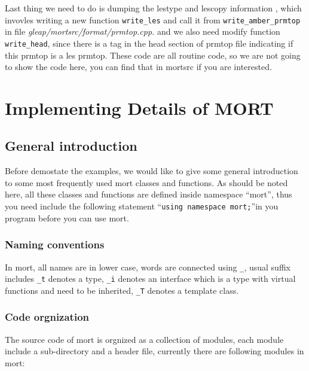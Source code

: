 \documentclass[letterpaper]{book}
\begin{document}
Last thing we need to do is dumping the lestype and lescopy information , which invovles writing
a new function \lstinline$write_les$ and call it from \lstinline$write_amber_prmtop$ in file 
{\it gleap/mortsrc/format/prmtop.cpp.} and we also need modify function \lstinline$write_head$, since 
there is a tag in the head section of prmtop file indicating if this prmtop is a les prmtop. These 
code are all routine code, so we are not going to show the code here, you can find 
that in mortsrc if you are interested. 



\chapter{Implementing Details of MORT}


\section{General introduction}
  Before demostate the examples, we would like to give some general introduction to some
most frequently used mort classes and functions. As should be noted here, all these classes
and functions are defined inside namespace ``mort'', thus you need include the following 
statement ``\lstinline$using namespace mort;$''in you program before you can use mort.

\subsection{Naming conventions}
  In mort, all names are in lower case, words are connected using \lstinline$_$, usual suffix 
includes \lstinline$_t$ denotes a type, \lstinline$_i$ denotes an interface which is a type with virtual
functions and need to be inherited, \lstinline$_T$ denotes a template class.

\subsection{Code orgnization}
  The source code of mort is orgnized as a collection of modules, each module include a sub-directory
and a header file, currently there are following modules in mort:
\end{document}
